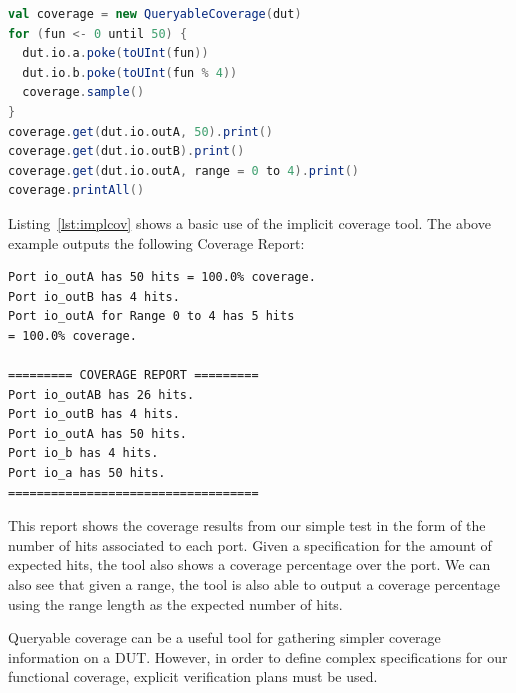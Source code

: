 \documentclass[conference]{IEEEtran}
\begin{document}
\begin{lstlisting}[captionpos=b,caption={Example use of Queryable coverage in order to gain information about the DUT's testing process. Note that \texttt{outA} and \texttt{outB} simply output the values of \texttt{a} and \texttt{b}.},label={lst:implcov},language=scala]
val coverage = new QueryableCoverage(dut)
for (fun <- 0 until 50) {
  dut.io.a.poke(toUInt(fun))
  dut.io.b.poke(toUInt(fun % 4))
  coverage.sample()
}
coverage.get(dut.io.outA, 50).print()
coverage.get(dut.io.outB).print()
coverage.get(dut.io.outA, range = 0 to 4).print()
coverage.printAll()
\end{lstlisting}
Listing~\ref{lst:implcov} shows a basic use of the implicit coverage tool. 
The above example outputs the following Coverage Report:  
\begin{verbatim}
Port io_outA has 50 hits = 100.0% coverage.
Port io_outB has 4 hits.
Port io_outA for Range 0 to 4 has 5 hits 
= 100.0% coverage.  

========= COVERAGE REPORT ========= 
Port io_outAB has 26 hits.
Port io_outB has 4 hits.
Port io_outA has 50 hits.
Port io_b has 4 hits.
Port io_a has 50 hits.
===================================
\end{verbatim}
This report shows the coverage results from our simple test in the form of the number of hits associated to each port.
Given a specification for the amount of expected hits, the tool also shows a coverage percentage over the port.
We can also see that given a range, the tool is also able to output a coverage percentage using the range length as the expected number of hits.

Queryable coverage can be a useful tool for gathering simpler coverage information on a DUT.
However, in order to define complex specifications for our functional coverage, explicit verification plans must be used.
\end{document}
